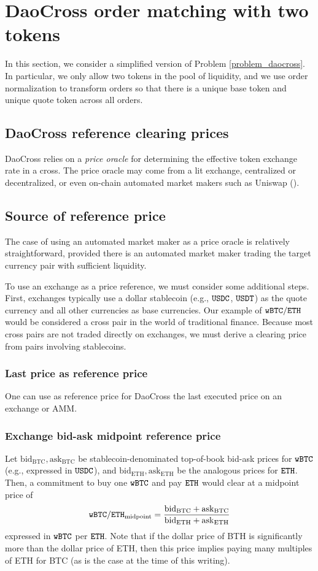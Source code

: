 \documentclass[11pt, reqno]{amsart}
\theoremstyle{definition}
\theoremstyle{remark}
\newcommand{\bidbtc}{\mathrm{bid}_\mathrm{BTC}}
\newcommand{\askbtc}{\mathrm{ask}_\mathrm{BTC}}
\newcommand{\bideth}{\mathrm{bid}_\mathrm{ETH}}
\newcommand{\asketh}{\mathrm{ask}_\mathrm{ETH}}
\newcommand{\BTC}{\textnormal{\texttt{wBTC}}}
\newcommand{\ETH}{\textnormal{\texttt{ETH}}}
\newcommand{\USDC}{\textnormal{\texttt{USDC}}}
\newcommand{\USDT}{\textnormal{\texttt{USDT}}}
\newcommand{\midpoint}{\mathrm{midpoint}}
\begin{document}
\section{DaoCross order matching with two tokens}

In this section, we consider a simplified version of Problem
\ref{problem_daocross}. In particular, we only allow two tokens in the pool
of liquidity, and we use order normalization to transform orders so that
there is a unique base token and unique quote token across all orders.

\subsection{DaoCross reference clearing prices}
DaoCross relies on a \emph{price oracle} for determining the effective
token exchange rate in a cross. The price oracle may come from a lit
exchange, centralized or decentralized, or even on-chain automated market
makers such as Uniswap (\cite[\S 2.2]{AdZiRo20}).

\subsection{Source of reference price}
The case of using an automated market maker as a price oracle is relatively
straightforward, provided there is an automated market maker trading the
target currency pair with sufficient liquidity.

To use an exchange as a price reference, we must consider some additional
steps. First, exchanges typically use a dollar stablecoin (e.g., $\USDC$,
$\USDT$) as the quote currency and all other currencies as base currencies. Our
example of $\BTC/\ETH$ would be considered a cross pair in the world of
traditional finance. Because most cross pairs are not traded directly on
exchanges, we must derive a clearing price from pairs involving stablecoins.

\subsubsection{Last price as reference price}
One can use as reference price for DaoCross the last executed price on an
exchange or AMM.

\subsubsection{Exchange bid-ask midpoint reference price}
Let $\bidbtc, \askbtc$ be stablecoin-denominated top-of-book bid-ask prices
for $\BTC$ (e.g., expressed in $\USDC$), and $\bideth, \asketh$ be the analogous
prices for $\ETH$. Then, a commitment to buy one $\BTC$ and pay $\ETH$ would
clear at a midpoint price of
\[
	\BTC/\ETH_{\midpoint} = \frac{\bidbtc + \askbtc}{\bideth + \asketh}
\]
expressed in $\BTC$ per $\ETH$. Note that if the dollar price of BTH is significantly
more than the dollar price of ETH, then this price implies paying many
multiples of ETH for BTC (as is the case at the time of this writing).
\end{document}
